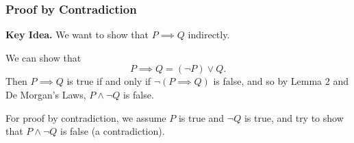\documentclass[class=article, crop=false]{standalone}
\begin{document}
  \subsubsection{Proof by Contradiction}
  \textbf{Key Idea.} We want to show that $P\implies Q$ indirectly.
  \begin{lemma}{2}
    We can show that
    \[
      P\implies Q = (\neg P)\lor Q.
    \]
    Then $P\implies Q$ is true if and only if $\neg(P\implies Q)$ is false, and so by Lemma $2$  and De Morgan's Laws, $P\land \neg Q$ is false.
  \end{lemma}
  For proof by contradiction, we assume $P$ is true and $\neg Q$ is true, and try to show that $P\land \neg Q$ is false (a contradiction).
\end{document}
